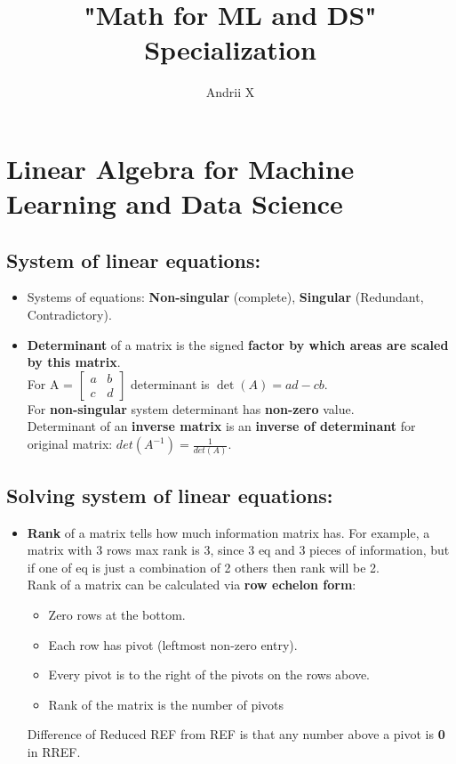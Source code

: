 \documentclass[16pt]{article}
\title{"Math for ML and DS" Specialization }
\author{ Andrii X }
\date{}
\begin{document}
	\maketitle
	
	\section{Linear Algebra for Machine Learning and Data Science}
	\subsection{System of linear equations:}
	\begin{itemize}
	\item {Systems of equations: \textbf{Non-singular} (complete), \textbf{Singular} (Redundant, Contradictory).}
	\item {\textbf{Determinant} of a matrix is the signed \textbf{factor by which areas are scaled by this matrix}. 
	\\
	For A = 
	$\begin{bmatrix}
		a & b\\
		c & d
	\end{bmatrix}$ 
	determinant is $\det(A) = ad-cb$. 
	\\
	For \textbf{non-singular} system determinant has \textbf{non-zero} value.
	\\
	Determinant of an \textbf{inverse matrix} is an \textbf{inverse of determinant} for original matrix: 
	$det(A^{-1})=\frac{1}{det(A)}$. 
	}
	\end{itemize}
	\subsection{Solving system of linear equations:}
	\begin{itemize}
	\item {\textbf{Rank} of a matrix tells how much information matrix has. For example, a matrix with 3 rows max rank is 3, since 3 eq and 3 pieces of information, but if one of eq is just a combination of 2 others then rank will be 2.
	\\
	Rank of a matrix can be calculated via \textbf{row echelon form}: 
	\begin{itemize}
		\item Zero rows at the bottom. 
		\item Each row has pivot (leftmost non-zero entry). 
		\item Every pivot is to the right of the pivots on the rows above. 
		\item Rank of the matrix is the number of pivots
	\end{itemize}
	Difference of Reduced REF from REF is that any number above a pivot is \textbf{0} in RREF. 
	}	
	\end{itemize}
\end{document}
